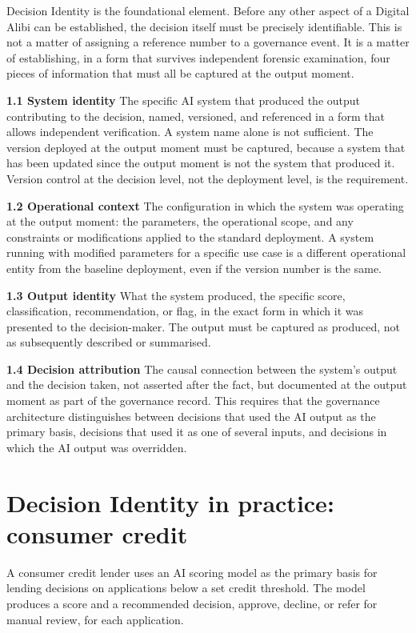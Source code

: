 Decision Identity is the foundational element. Before any other aspect of a Digital Alibi can be established, the decision itself must be precisely identifiable. This is not a matter of assigning a reference number to a governance event. It is a matter of establishing, in a form that survives independent forensic examination, four pieces of information that must all be captured at the output moment.

\textbf{1.1 System identity} The specific AI system that produced the output contributing to the decision, named, versioned, and referenced in a form that allows independent verification. A system name alone is not sufficient. The version deployed at the output moment must be captured, because a system that has been updated since the output moment is not the system that produced it. Version control at the decision level, not the deployment level, is the requirement.

\textbf{1.2 Operational context} The configuration in which the system was operating at the output moment: the parameters, the operational scope, and any constraints or modifications applied to the standard deployment. A system running with modified parameters for a specific use case is a different operational entity from the baseline deployment, even if the version number is the same.

\textbf{1.3 Output identity} What the system produced, the specific score, classification, recommendation, or flag, in the exact form in which it was presented to the decision-maker. The output must be captured as produced, not as subsequently described or summarised.

\textbf{1.4 Decision attribution} The causal connection between the system's output and the decision taken, not asserted after the fact, but documented at the output moment as part of the governance record. This requires that the governance architecture distinguishes between decisions that used the AI output as the primary basis, decisions that used it as one of several inputs, and decisions in which the AI output was overridden.

\section{Decision Identity in practice: consumer credit}

A consumer credit lender uses an AI scoring model as the primary basis for lending decisions on applications below a set credit threshold. The model produces a score and a recommended decision, approve, decline, or refer for manual review, for each application.

